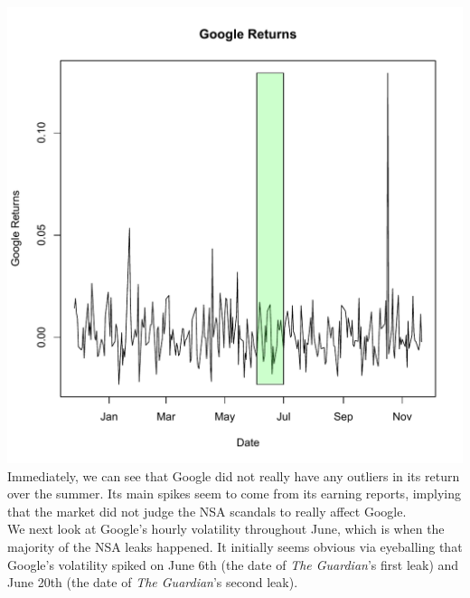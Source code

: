 \documentclass[11pt]{amsart}
\begin{document}
\includegraphics[scale=0.4]{goog_returns_11_25.pdf} \\

Immediately, we can see that Google did not really have any outliers in its return over the summer. Its main spikes seem to come from its earning reports, implying that the market did not judge the NSA scandals to really affect Google. \\

We next look at Google's hourly volatility throughout June, which is when the majority of the NSA leaks happened. It initially seems obvious via eyeballing that Google's volatility spiked on June 6th (the date of \textit{The Guardian}'s first leak) and June 20th (the date of \textit{The Guardian}'s second leak). \\
\end{document}
